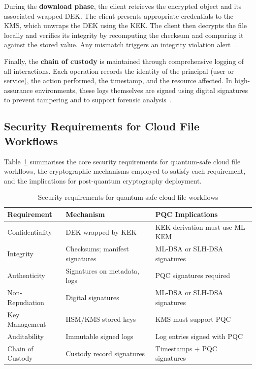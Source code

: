 \documentclass[12pt,a4paper]{article}
\begin{document}
During the \textbf{download phase}, the client retrieves the encrypted object and its associated wrapped DEK. The client presents appropriate credentials to the KMS, which unwraps the DEK using the KEK. The client then decrypts the file locally and verifies its integrity by recomputing the checksum and comparing it against the stored value. Any mismatch triggers an integrity violation alert~\cite{aws-s3-integrity-verification-2024}.

Finally, the \textbf{chain of custody} is maintained through comprehensive logging of all interactions. Each operation records the identity of the principal (user or service), the action performed, the timestamp, and the resource affected. In high-assurance environments, these logs themselves are signed using digital signatures to prevent tampering and to support forensic analysis~\cite{nist-sp800-92-2006}.

\subsection{Security Requirements for Cloud File Workflows}

Table~\ref{tab:security-requirements} summarises the core security requirements for quantum-safe cloud file workflows, the cryptographic mechanisms employed to satisfy each requirement, and the implications for post-quantum cryptography deployment.

\begin{table}[htbp]
\centering
\caption{Security requirements for quantum-safe cloud file workflows}
\label{tab:security-requirements}
\begin{tabular}{lll}
\toprule
\textbf{Requirement} & \textbf{Mechanism} & \textbf{PQC Implications} \\
\midrule
Confidentiality & DEK wrapped by KEK & KEK derivation must use ML-KEM \\
Integrity & Checksums; manifest signatures & ML-DSA or SLH-DSA signatures \\
Authenticity & Signatures on metadata, logs & PQC signatures required \\
Non-Repudiation & Digital signatures & ML-DSA or SLH-DSA signatures \\
Key Management & HSM/KMS stored keys & KMS must support PQC \\
Auditability & Immutable signed logs & Log entries signed with PQC \\
Chain of Custody & Custody record signatures & Timestamps + PQC signatures \\
\bottomrule
\end{tabular}
\end{table}
\end{document}
